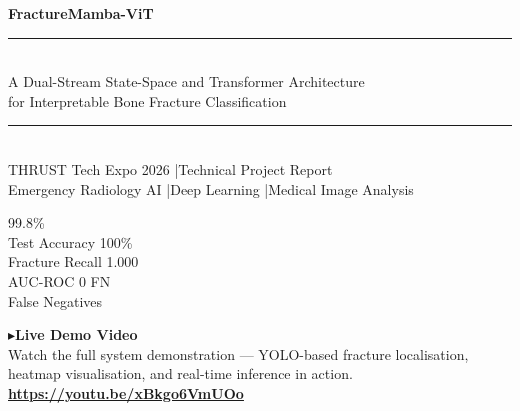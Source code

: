 \documentclass[12pt, a4paper]{article}
\begin{document}
\thispagestyle{empty}
\pagecolor{NavyBlue}
\color{white}

\vspace*{3.5cm}

\begin{center}
  {\fontsize{30}{36}\selectfont\bfseries FractureMamba-ViT}\\[0.5em]
  \textcolor{TealBlue}{\rule{0.6\linewidth}{1.5pt}}\\[0.8em]
  {\large A Dual-Stream State-Space and Transformer Architecture\\[0.3em]
   for Interpretable Bone Fracture Classification}\\[1.2em]
  \textcolor{AccentCyan}{\rule{0.4\linewidth}{0.6pt}}\\[0.8em]
  {\normalsize THRUST Tech Expo 2026 \quad|\quad Technical Project Report}\\[0.3em]
  {\small Emergency Radiology AI \quad|\quad Deep Learning \quad|\quad Medical Image Analysis}
\end{center}

\vspace{1.8cm}

\begin{tcbitemize}[
  raster columns=4,
  raster equal height,
  colback=NavyBlue!70!black,
  colframe=TealBlue,
  boxrule=0.8pt,
  arc=4pt,
  fontupper=\bfseries\color{AccentCyan}\centering,
  halign=center,
  valign=center,
  size=normal
]
  \tcbitem \large 99.8\%\\[2pt]\normalsize Test Accuracy
  \tcbitem \large 100\%\\[2pt]\normalsize Fracture Recall
  \tcbitem \large 1.000\\[2pt]\normalsize AUC-ROC
  \tcbitem \large 0 FN\\[2pt]\normalsize False Negatives
\end{tcbitemize}


\vspace{1.2cm}

\begin{tcolorbox}[
  enhanced,
  colback=NavyBlue!60!black,
  colframe=TealBlue,
  boxrule=1.5pt,
  arc=6pt,
  left=12pt, right=12pt, top=10pt, bottom=10pt,
  halign=center
]
  {\large\bfseries\color{AccentCyan} $\blacktriangleright$\enspace Live Demo Video}\\[0.5em]
  {\normalsize\color{white}
    Watch the full system demonstration — YOLO-based fracture localisation,\\
    heatmap visualisation, and real-time inference in action.
  }\\[0.7em]
  {\small\color{TealBlue}
    \href{https://youtu.be/xBkgo6VmUOo}{\textbf{\textcolor{AccentCyan}{\underline{https://youtu.be/xBkgo6VmUOo}}}}
  }
\end{tcolorbox}
\end{document}
